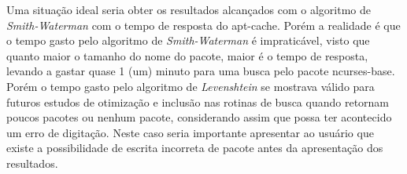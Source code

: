 Uma situação ideal seria obter os resultados alcançados com o algoritmo de \textit{Smith-Waterman} com o tempo de resposta do {\code apt-cache}. Porém a realidade é que o tempo gasto pelo algoritmo de \textit{Smith-Waterman} é impraticável, visto que quanto maior o tamanho do nome do pacote, maior é o tempo de resposta, levando a gastar quase 1 (um) minuto para uma busca pelo pacote {\code ncurses-base}. 
Porém o tempo gasto pelo algoritmo de \textit{Levenshtein} se mostrava válido para futuros estudos de otimização e inclusão nas rotinas de busca quando retornam poucos pacotes ou nenhum pacote, considerando assim que possa ter acontecido um erro de digitação. Neste caso seria importante apresentar ao usuário que existe a possibilidade de escrita incorreta de pacote antes da apresentação dos resultados.


\begin{table}[htbp]
\caption{Comparação de resultados com entradas contendo erros de ortografia}
\end{table}
